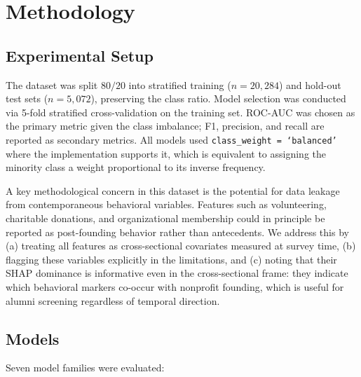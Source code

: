 \documentclass[10pt,twocolumn]{article}
\begin{document}
\section{Methodology}
\label{sec:methods}

\subsection{Experimental Setup}

The dataset was split $80/20$ into stratified training ($n = 20{,}284$) and hold-out test sets ($n = 5{,}072$), preserving the class ratio. Model selection was conducted via 5-fold stratified cross-validation on the training set. ROC-AUC was chosen as the primary metric given the class imbalance; F1, precision, and recall are reported as secondary metrics. All models used \texttt{class\_weight = `balanced'} where the implementation supports it, which is equivalent to assigning the minority class a weight proportional to its inverse frequency.

A key methodological concern in this dataset is the potential for data leakage from contemporaneous behavioral variables. Features such as volunteering, charitable donations, and organizational membership could in principle be reported as post-founding behavior rather than antecedents. We address this by (a) treating all features as cross-sectional covariates measured at survey time, (b) flagging these variables explicitly in the limitations, and (c) noting that their SHAP dominance is informative even in the cross-sectional frame: they indicate which behavioral markers co-occur with nonprofit founding, which is useful for alumni screening regardless of temporal direction.

\subsection{Models}

Seven model families were evaluated:
\end{document}

